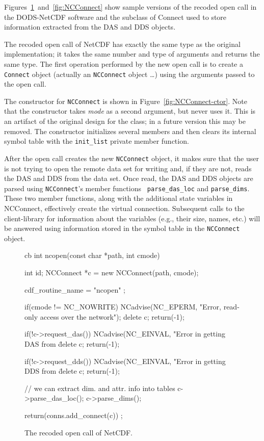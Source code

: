 Figures~\ref{fig:open}~and~\ref{fig:NCConnect} show sample versions of the
recoded open call in the DODS-NetCDF software and the subclass of Connect
used to store information extracted from the DAS and DDS objects.

The recoded open call of NetCDF has exactly the same type as the original
implementation; it takes the same number and type of arguments and returns
the same type. The first operation performed by the new open call is to
create a {\tt Connect} object (actually an {\tt NCConnect} object \ldots)
using the arguments passed to the open call.

The constructor for {\tt NCConnect} is shown in
Figure~\ref{fig:NCConnect-ctor}. Note that the constructor takes {\em mode\/}
as a second argument, but never uses it. This is an artifact of the original
design for the class; in a future version this may be removed. The
constructor initializes several members and then clears its internal symbol
table with the {\tt init\_list} private member function.

After the open call creates the new {\tt NCConnect} object, it makes sure
that the user is not trying to open the remote data set for writing and, if
they are not, reads the DAS and DDS from the data set. Once read, the DAS and
DDS objects are parsed using {\tt NCConnect}'s member functions {\tt
  parse\_das\_loc} and {\tt parse\_dims}. These two member functions, along
with the additional state variables in NCConnect, effectively create the
virtual connection. Subsequent calls to the client-library for information
about the variables (e.g., their size, names, etc.) will be answered using
information stored in the symbol table in the {\tt NCConnect} object.

\begin{figure}
\begin{code}{cb}
int
ncopen(const char *path, int cmode)
{
    int id;
    NCConnect *c = new NCConnect(path, cmode);

    cdf_routine_name = "ncopen" ;

    if(cmode != NC_NOWRITE) {    
        NCadvise(NC_EPERM, "Error, read-only access over the network");
        delete c;
        return(-1);
    }

    if(!c->request_das()){
        NCadvise(NC_EINVAL, "Error in getting DAS from \"%
        delete c;
        return(-1);
    }

    if(!c->request_dds()){
        NCadvise(NC_EINVAL, "Error in getting DDS from \"%
        delete c;
        return(-1);
    }

    // we can extract dim. and attr. info into tables
    c->parse_das_loc();
    c->parse_dims();

    return(conns.add_connect(c)) ;
}
\end{code}
\caption{The recoded open call of NetCDF.}
\label{fig:open}
\end{figure}

